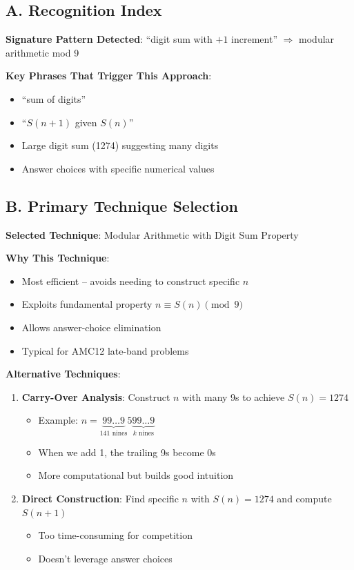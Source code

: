 \documentclass[]{article}
\begin{document}
\begin{techniquesbox}
\subsection*{A. Recognition Index}
\textbf{Signature Pattern Detected}: ``digit sum with $+1$ increment'' $\Rightarrow$ modular arithmetic mod 9

\textbf{Key Phrases That Trigger This Approach}:
\begin{itemize}
    \item ``sum of digits''
    \item ``$S(n+1)$ given $S(n)$''
    \item Large digit sum (1274) suggesting many digits
    \item Answer choices with specific numerical values
\end{itemize}

\subsection*{B. Primary Technique Selection}
\textbf{Selected Technique}: Modular Arithmetic with Digit Sum Property

\textbf{Why This Technique}:
\begin{itemize}
    \item Most efficient -- avoids needing to construct specific $n$
    \item Exploits fundamental property $n \equiv S(n) \pmod{9}$
    \item Allows answer-choice elimination
    \item Typical for AMC12 late-band problems
\end{itemize}

\textbf{Alternative Techniques}:
\begin{enumerate}
    \item \textbf{Carry-Over Analysis}: Construct $n$ with many 9s to achieve $S(n) = 1274$
    \begin{itemize}
        \item Example: $n = \underbrace{99\ldots9}_{141 \text{ nines}}5\underbrace{99\ldots9}_{k \text{ nines}}$
        \item When we add 1, the trailing 9s become 0s
        \item More computational but builds good intuition
    \end{itemize}
    \item \textbf{Direct Construction}: Find specific $n$ with $S(n) = 1274$ and compute $S(n+1)$
    \begin{itemize}
        \item Too time-consuming for competition
        \item Doesn't leverage answer choices
    \end{itemize}
\end{enumerate}


\end{techniquesbox}
\end{document}
